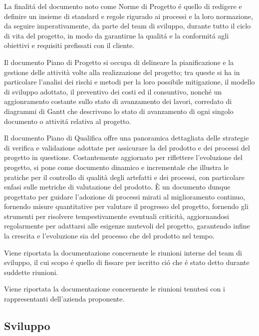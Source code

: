 La finalitá del documento noto come Norme di Progetto é quello di redigere e definire un insieme di standard e regole rigurado ai processi e la loro normazione, da seguire imperativamente, da parte del team di sviluppo, durante tutto il ciclo di vita del progetto, in modo da garantirne la qualitá e la conformitá agli obiettivi e requisiti prefissati con il cliente.

Il documento Piano di Progetto si occupa di delineare la pianificazione e la gestione delle attività volte alla realizzazione del progetto; tra queste si ha in particolare l'analisi dei rischi e metodi per la loro possibile mitigazione, il modello di sviluppo adottato, il preventivo dei costi ed il consuntivo, nonché un aggionramento costante sullo stato di avanzamento dei lavori, corredato di diagrammi di Gantt che descrivono lo stato di avanzamento di ogni singolo documento o attivitá relativa al progetto.

Il documento Piano di Qualifica offre una panoramica dettagliata delle strategie di verifica e validazione adottate per assicurare la  del prodotto e dei processi del progetto in questione. Costantemente aggiornato per riflettere l'evoluzione del progetto, si pone come documento dinamico e incrementale che illustra le pratiche per il controllo di qualità degli artefatti e dei processi, con particolare enfasi sulle metriche di valutazione del prodotto. È un documento dunque progettato per guidare l'adozione di processi mirati al miglioramento continuo, fornendo misure quantitative per valutare il progresso del progetto, fornendo gli strumenti per risolvere tempestivamente eventuali criticità, aggiornandosi regolarmente per adattarsi alle esigenze mutevoli del progetto, garantendo infine la crescita e l'evoluzione sia del processo che del prodotto nel tempo.


Viene riportata la documentazione concernente le riunioni interne del team di sviluppo, il cui scopo é quello di fissare per iscritto ció che é stato detto durante suddette riunioni. %

Viene riportata la documentazione concernente le riunioni tenutesi con i rappresentanti dell'azienda proponente. %

\subsection{Sviluppo}